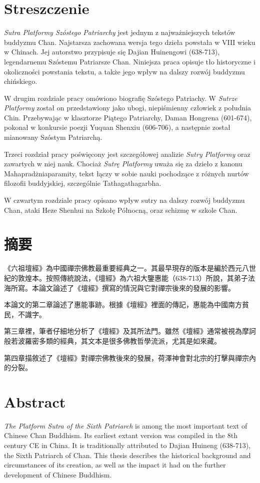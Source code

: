 \makeatletter
\@openrightfalse
\makeatother
\chapter*{Streszczenie}
\textit{Sutra Platformy Szóstego Patriarchy} jest jednym z najważniejszych tekstów buddyzmu Chan.
Najstarsza zachowana wersja tego dzieła powstała w VIII wieku w Chinach.
Jej autorstwo przypisuje się Dajian Huinengowi (638-713), legendarnemu Szóstemu Patriarsze Chan.
Niniejsza praca opisuje tło historyczne i okoliczności powstania tekstu, a także jego wpływ na dalszy rozwój buddyzmu chińskiego.

W drugim rozdziale pracy omówiono biografię Szóstego Patriachy.
W \textit{Sutrze Platformy} został on przedstawiony jako ubogi, niepiśmienny człowiek z południa Chin.
Przebywając w klasztorze Piątego Patriarchy, Daman Hongrena (601-674), pokonał w konkursie poezji Yuquan Shenxiu (606-706), a następnie został mianowany Szóstym Patriarchą.

Trzeci rozdział pracy poświęcony jest szczegółowej analizie \textit{Sutry Platformy} oraz zawartych w niej nauk.
Chociaż \textit{Sutrę Platformy} uważa się za dzieło z kanonu Mahapradżniaparamity, tekst łączy w sobie nauki pochodzące z różnych nurtów filozofii buddyjskiej, szczególnie Tathagathagarbha.

W czwartym rozdziale pracy opisano wpływ sutry na dalszy rozwój buddyzmu Chan, ataki Heze Shenhui na Szkołę Północną, oraz schizmę w szkole Chan.

\chapter*{摘要}
《六祖壇經》為中國禪宗佛教最重要經典之一。其最早現存的版本是編於西元八世紀的敦煌本。按照傳統說法，《壇經》為六祖大鑒惠能（638-713）所說，其弟子法海所寫。本論文論述了《壇經》撰寫的情況與它對禪宗後來的發展的影響。

本論文的第二章論述了惠能事跡。根據《壇經》裡面的傳記，惠能為中國南方貧民，不識字。

第三章裡，筆者仔細地分析了《壇經》及其所法門。雖然《壇經》通常被視為摩訶般若波羅密多類的經典，其文本是很多佛教哲學流派，尤其是如來藏。

第四章描敘述了《壇經》對禪宗佛教後來的發展，荷澤神會對北宗的打擊與禪宗內的分裂。

\chapter*{Abstract}
\textit{The Platform Sutra of the Sixth Patriarch} is among the most important text of Chinese Chan Buddhism.
Its earliest extant version was compiled in the 8th century CE in China.
It is traditionally attributed to Dajian Huineng (638-713), the Sixth Patriarch of Chan.
This thesis describes the historical background and circumstances of its creation, as well as the impact it had on the further development of Chinese Buddhism.


